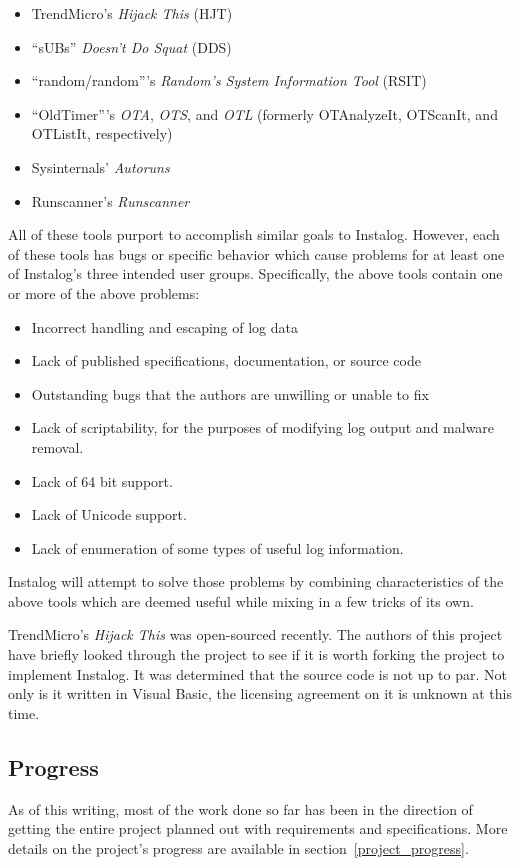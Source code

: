 \documentclass[letterpaper,12pt]{article}
\begin{document}
\begin{itemize}
    \item TrendMicro's {\em Hijack This} (HJT)
    \item ``sUBs'' {\em Doesn't Do Squat} (DDS)
    \item ``random/random'''s {\em Random's System Information Tool} (RSIT)
    \item ``OldTimer'''s {\em OTA}, {\em OTS}, and {\em OTL} (formerly
    OTAnalyzeIt, OTScanIt, and OTListIt, respectively)
    \item Sysinternals' {\em Autoruns}
    \item Runscanner's {\em Runscanner}
\end{itemize}

All of these tools purport to accomplish similar goals to Instalog. However,
each of these tools has bugs or specific behavior which cause problems for at
least one of Instalog's three intended user groups.  Specifically, the above
tools contain one or more of the above problems:

\begin{itemize}
    \item Incorrect handling and escaping of log data
    \item Lack of published specifications, documentation, or source code
    \item Outstanding bugs that the authors are unwilling or unable to fix
    \item Lack of scriptability, for the purposes of modifying log output and
    malware removal.
    \item Lack of 64 bit support.
    \item Lack of Unicode support.
    \item Lack of enumeration of some types of useful log information.
\end{itemize}

Instalog will attempt to solve those problems by combining characteristics of
the above tools which are deemed useful while mixing in a few tricks of its
own.

TrendMicro's {\em Hijack This} was open-sourced recently.  The authors of this
project have briefly looked through the project to see if it is worth forking
the project to implement Instalog.  It was determined that the source code is
not up to par.  Not only is it written in Visual Basic, the licensing agreement
on it is unknown at this time.  

\subsection{Progress}
As of this writing, most of the work done so far has been in the direction of
getting the entire project planned out with requirements and specifications.
More details on the project's progress are available in
section~\ref{project_progress}.
\end{document}
